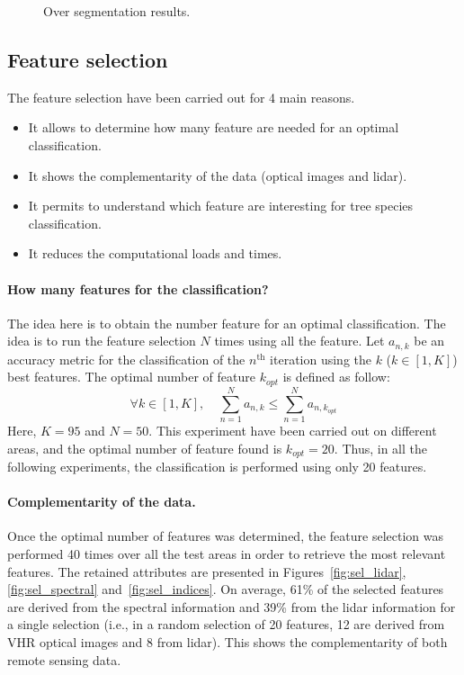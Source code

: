 \begin{figure}[htbp]
\begin{center}
\endgroup
\caption{Over segmentation results.}
\label{fig:C3_S3_ss1_results}
\end{center}
\end{figure}


\subsection{Feature selection}

The feature selection have been carried out for 4 main reasons.
\begin{itemize}
\item It allows to determine how many feature are needed for an optimal classification.
\item It shows the complementarity of the data (optical images and lidar).
\item It permits to understand which feature are interesting for tree species classification.
\item It reduces the computational loads and times.
\end{itemize}

\paragraph{How many features for the classification? \\}
The idea here is to obtain the number feature for an optimal classification. The idea is to run the feature selection $N$ times using all the feature. Let $a_{n,k}$ be an accuracy metric for the classification of the $n^{\text{th}}$ iteration using the $k$ ($k \in [1,K]$) best features.
The optimal number of feature $k_{opt}$ is defined as follow:
\begin{equation}
\forall k \in [1,K], \quad \sum_{n=1}^{N}a_{n,k} \leq \sum_{n=1}^{N}a_{n,k_{opt}}
\end{equation}
Here, $K=95$ and $N=50$. This experiment have been carried out on different areas, and the optimal number of feature found is $k_{opt}=20$. Thus, in all the following experiments, the classification is performed using only 20 features.

\paragraph{Complementarity of the data. \\}
Once the optimal number of features was determined, the feature selection was performed 40 times over all the test areas in order to retrieve the most relevant features. The retained attributes are presented in Figures~\ref{fig:sel_lidar},\ref{fig:sel_spectral} and~\ref{fig:sel_indices}. On average, 61\% of the selected features are derived from the spectral information and 39\% from the lidar information for a single selection (i.e., in a random selection of 20 features, 12 are derived from VHR optical images and 8 from lidar). This shows the complementarity of both remote sensing data. 

